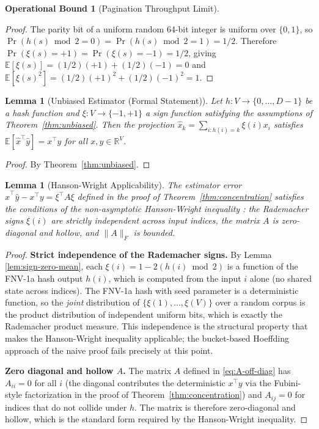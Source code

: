 \documentclass[10pt,twocolumn]{article}
\newtheorem{lemma}[theorem]{Lemma}
\theoremstyle{definition}
\newtheorem{operationalbound}[theorem]{Operational Bound}
\theoremstyle{remark}
\begin{document}
\begin{operationalbound}[Pagination Throughput Limit]
\begin{proof}
The parity bit of a uniform random 64-bit integer is uniform over
$\{0, 1\}$, so $\Pr(h(s) \bmod 2 = 0) = \Pr(h(s) \bmod 2 = 1) = 1/2$.
Therefore $\Pr(\xi(s) = +1) = \Pr(\xi(s) = -1) = 1/2$, giving
$\mathbb{E}[\xi(s)] = (1/2)(+1) + (1/2)(-1) = 0$ and
$\mathbb{E}[\xi(s)^2] = (1/2)(+1)^2 + (1/2)(-1)^2 = 1$. \qedhere
\end{proof}

\begin{lemma}[Unbiased Estimator (Formal Statement)]
\label{lem:unbiased-formal}
Let $h: V \to \{0, \ldots, D-1\}$ be a hash function and
$\xi: V \to \{-1, +1\}$ a sign function satisfying the assumptions
of Theorem~\ref{thm:unbiased}. Then the projection
$\hat{x}_k = \sum_{i: h(i)=k} \xi(i) x_i$ satisfies
$\mathbb{E}[\hat{x}^\top \hat{y}] = x^\top y$ for all $x, y \in
\mathbb{R}^V$.
\end{lemma}

\begin{proof}
By Theorem~\ref{thm:unbiased}. \qedhere
\end{proof}

\begin{lemma}[Hanson-Wright Applicability]
\label{lem:hanson-wright-applicability}
The estimator error $\hat{x}^\top \hat{y} - x^\top y = \xi^\top A \xi$
defined in the proof of Theorem~\ref{thm:concentration} satisfies the
conditions of the non-asymptotic Hanson-Wright inequality
\citep{hansonwright1971}: the Rademacher signs $\xi(i)$ are strictly
independent across input indices, the matrix $A$ is zero-diagonal and
hollow, and $\|A\|_F$ is bounded.
\end{lemma}

\begin{proof}
\textbf{Strict independence of the Rademacher signs.} By Lemma~
\ref{lem:sign-zero-mean}, each $\xi(i) = 1 - 2(h(i) \bmod 2)$ is a
function of the FNV-1a hash output $h(i)$, which is computed from the
input $i$ alone (no shared state across indices). The FNV-1a hash
with seed parameter is a deterministic function, so the
\emph{joint} distribution of $\{\xi(1), \ldots, \xi(V)\}$ over a
random corpus is the product distribution of independent uniform
bits, which is exactly the Rademacher product measure. This
independence is the structural property that makes the Hanson-Wright
inequality applicable; the bucket-based Hoeffding approach of the
naive proof fails precisely at this point.

\textbf{Zero diagonal and hollow $A$.} The matrix $A$ defined in
\eqref{eq:A-off-diag} has $A_{ii} = 0$ for all $i$ (the diagonal
contributes the deterministic $x^\top y$ via the Fubini-style
factorization in the proof of Theorem~\ref{thm:concentration}) and
$A_{ij} = 0$ for indices that do not collide under $h$. The matrix
is therefore zero-diagonal and hollow, which is the standard form
required by the Hanson-Wright inequality.


\end{proof}
\end{operationalbound}
\end{document}
